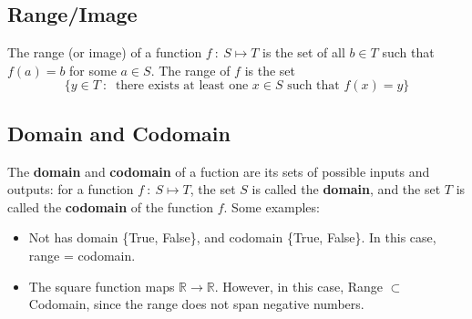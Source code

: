 \documentclass[10pt]{article}
\begin{document}
\subsection*{Range/Image}
The range (or image) of a function $f \::\: S \mapsto T$ is the set of all $b \in T$ such that $f(a) = b$ for some $a \in S$.  The range of $f$ is the set
\[\{y \in T \::\: \text{ there exists at least one $x \in S$ such that $f(x) = y$}\}\]

\subsection*{Domain and Codomain}
The \textbf{domain} and \textbf{codomain} of a fuction are its sets of possible inputs and outputs:  for a function $f \::\: S \mapsto T$, the set $S$ is called the \textbf{domain}, and the set $T$ is called the \textbf{codomain} of the function $f$.  Some examples:
\begin{itemize}
	\item Not has domain \{True, False\}, and codomain \{True, False\}.  In this case, range = codomain.
	\item The square function maps $\mathbb{R} \rightarrow \mathbb{R}$.  However, in this case, Range $\subset$ Codomain, since the range does not span negative numbers.
\end{itemize}
\end{document}
